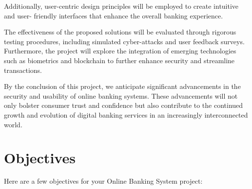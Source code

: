 \documentclass[12pt,a4paper]{report}
\begin{document}
Additionally, user-centric design principles will be employed to create intuitive and user-
friendly interfaces that enhance the overall banking experience.

The effectiveness of the proposed solutions will be evaluated through rigorous testing
procedures, including simulated cyber-attacks and user feedback surveys. Furthermore, the
project will explore the integration of emerging technologies such as biometrics and
blockchain to further enhance security and streamline transactions.

By the conclusion of this project, we anticipate significant advancements in the security and
usability of online banking systems. These advancements will not only bolster consumer
trust and confidence but also contribute to the continued growth and evolution of digital
banking services in an increasingly interconnected world.

\chapter{Objectives}

Here are a few objectives for your Online Banking System project:
\end{document}

